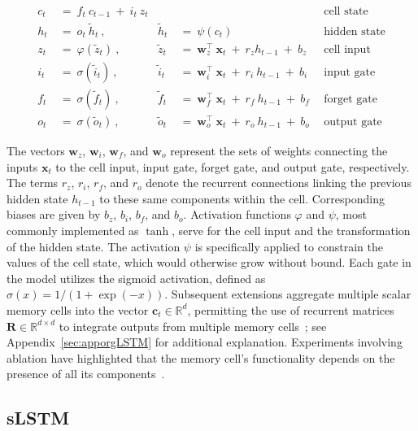 \begin{align}
c_t \ &= \  f_t \ c_{t-1} \ + \ i_t \ z_t &  & &\text{cell state} \\
h_t  \ &= \ o_t \ \tilde{h}_t \ , & \tilde{h}_t \ &= \ \psi \left( c_t\right)
  &\text{hidden state} \\
z_t \ &= \ \varphi \left( \tilde{z}_t \right) \ , 
  &\tilde{z}_t \ &=  \ \mathbf{w}^\top_{z} \ \mathbf{x}_t \ + \
  r_{z}  h_{t-1} \ + \  b_{z} \ \
  &\text{cell input} \\
i_t \ &= \ \sigma \left( \tilde{i}_t  \right) \ , 
  &\tilde{i}_t \ &= \ \mathbf{w}^\top_{i} \ \mathbf{x}_t \ + \
  r_{i}  \ h_{t-1} \ + \  b_{i} \ \
  &\text{input gate} \\
f_t \ &= \ \sigma \left(  \tilde{f}_t \right) \ , 
  &\tilde{f}_t \ &= \ \mathbf{w}^\top_{f} \ \mathbf{x}_t  \ + \
  r_{f}  \ h_{t-1} \ + \  b_{f} \ \
  &\text{forget gate} \\
o_t \ &= \ \sigma \left( \tilde{o}_t \right) \ , 
  &\tilde{o}_t  \ &= \ \mathbf{w}^\top_{o} \ \mathbf{x}_t \ + \
  r_{o}  \ h_{t-1} \ + \  b_{o} \ \
  &\text{output gate} 
\end{align}

The vectors $\mathbf{w}_{z}$, $\mathbf{w}_{i}$, $\mathbf{w}_{f}$, and $\mathbf{w}_{o}$ represent the sets of weights connecting the inputs $\mathbf{x}_t$ to the cell input, input gate, forget gate, and output gate, respectively. The terms $r_{z}$, $r_{i}$, $r_{f}$, and $r_{o}$ denote the recurrent connections linking the previous hidden state $h_{t-1}$ to these same components within the cell. Corresponding biases are given by $b_{z}$, $b_{i}$, $b_{f}$, and $b_{o}$. Activation functions $\varphi$ and $\psi$, most commonly implemented as $\tanh$, serve for the cell input and the transformation of the hidden state. The activation $\psi$ is specifically applied to constrain the values of the cell state, which would otherwise grow without bound. Each gate in the model utilizes the sigmoid activation, defined as $\sigma \left( x \right)= 1/(1+\exp(-x))$. Subsequent extensions aggregate multiple scalar memory cells into the vector $\mathbf{c}_t \in \mathbb{R}^{d}$, permitting the use of recurrent matrices $\mathbf{R} \in \mathbb{R}^{d \times d}$ to integrate outputs from multiple memory cells~\citep{Greff:15}; see Appendix~\ref{sec:apporgLSTM} for additional explanation. Experiments involving ablation have highlighted that the memory cell’s functionality depends on the presence of all its components~\citep{Greff:15}.

\subsection{sLSTM}
\label{sec:sLSTM}


